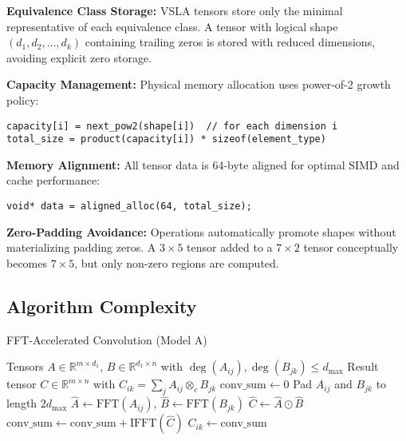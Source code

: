 \documentclass[11pt]{article}
\begin{document}
\begin{tcolorbox}[colback=memory,colframe=red!50!black,title=Memory Layout and Optimization]
\textbf{Equivalence Class Storage:} VSLA tensors store only the minimal representative of each equivalence class. A tensor with logical shape $(d_1, d_2, \ldots, d_k)$ containing trailing zeros is stored with reduced dimensions, avoiding explicit zero storage.

\textbf{Capacity Management:} Physical memory allocation uses power-of-2 growth policy:
\begin{verbatim}
capacity[i] = next_pow2(shape[i])  // for each dimension i
total_size = product(capacity[i]) * sizeof(element_type)  
\end{verbatim}

\textbf{Memory Alignment:} All tensor data is 64-byte aligned for optimal SIMD and cache performance:
\begin{verbatim}
void* data = aligned_alloc(64, total_size);
\end{verbatim}

\textbf{Zero-Padding Avoidance:} Operations automatically promote shapes without materializing padding zeros. A $3 \times 5$ tensor added to a $7 \times 2$ tensor conceptually becomes $7 \times 5$, but only non-zero regions are computed.
\end{tcolorbox}

\subsection{Algorithm Complexity}

\begin{algorithm}
\caption{FFT-Accelerated Convolution (Model A)}
\begin{algorithmic}[1]
\REQUIRE Tensors $A \in \mathbb{R}^{m \times d_1}$, $B \in \mathbb{R}^{d_1 \times n}$ with $\deg(A_{ij}), \deg(B_{jk}) \leq d_{\max}$
\ENSURE Result tensor $C \in \mathbb{R}^{m \times n}$ with $C_{ik} = \sum_j A_{ij} \otimes_c B_{jk}$
        \STATE $\text{conv\_sum} \leftarrow 0$
            \STATE Pad $A_{ij}$ and $B_{jk}$ to length $2d_{\max}$
            \STATE $\hat{A} \leftarrow \text{FFT}(A_{ij})$, $\hat{B} \leftarrow \text{FFT}(B_{jk})$ 
            \STATE $\hat{C} \leftarrow \hat{A} \odot \hat{B}$ 
            \STATE $\text{conv\_sum} \leftarrow \text{conv\_sum} + \text{IFFT}(\hat{C})$
        \ENDFOR
        \STATE $C_{ik} \leftarrow \text{conv\_sum}$
    \ENDFOR
\ENDFOR
\end{algorithmic}
\end{algorithm}
\end{document}
